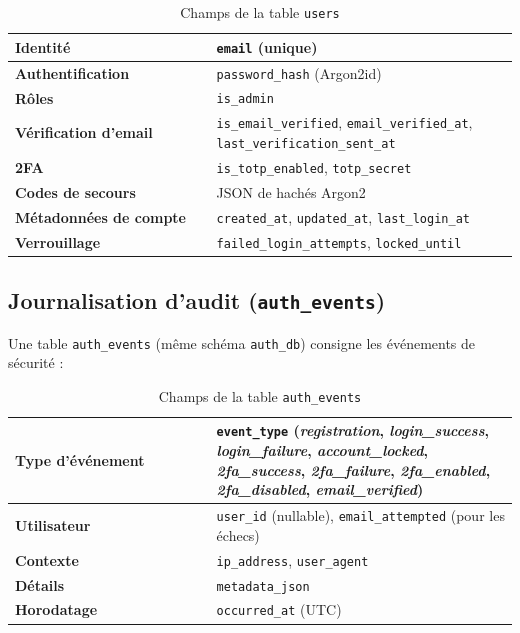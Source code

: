 \begin{table}[H]
\centering
\caption{Champs de la table \texttt{users}}
\label{tab:chap10_users_fields}
\noindent\begin{tabular}{@{}p{0.40\linewidth}p{0.60\linewidth}@{}}
\textbf{Identité} & \texttt{email} (unique) \\
\hline
\textbf{Authentification} & \texttt{password\_hash} (Argon2id) \\
\hline
\textbf{Rôles} & \texttt{is\_admin} \\
\hline
\textbf{Vérification d'email} & \texttt{is\_email\_verified}, \texttt{email\_verified\_at}, \texttt{last\_verification\_sent\_at} \\
\hline
\textbf{2FA} & \texttt{is\_totp\_enabled}, \texttt{totp\_secret} \\
\hline
\textbf{Codes de secours} & JSON de hachés Argon2 \\
\hline
\textbf{Métadonnées de compte} & \texttt{created\_at}, \texttt{updated\_at}, \texttt{last\_login\_at} \\
\hline
\textbf{Verrouillage} & \texttt{failed\_login\_attempts}, \texttt{locked\_until} \\
\end{tabular}
\end{table}


\subsection*{Journalisation d'audit (\texttt{auth\_events})}
\noindent Une table \texttt{auth\_events} (même schéma \texttt{auth\_db}) consigne les événements de sécurité :

\begin{table}[H]
\centering
\caption{Champs de la table \texttt{auth\_events}}
\label{tab:chap10_auth_events_fields}
\noindent\begin{tabular}{@{}p{0.40\linewidth}p{0.60\linewidth}@{}}
\textbf{Type d'événement} & \texttt{event\_type} (\textit{registration}, \textit{login\_success}, \textit{login\_failure}, \textit{account\_locked}, \textit{2fa\_success}, \textit{2fa\_failure}, \textit{2fa\_enabled}, \textit{2fa\_disabled}, \textit{email\_verified}) \\
\hline
\textbf{Utilisateur} & \texttt{user\_id} (nullable), \texttt{email\_attempted} (pour les échecs) \\
\hline
\textbf{Contexte} & \texttt{ip\_address}, \texttt{user\_agent} \\
\hline
\textbf{Détails} & \texttt{metadata\_json} \\
\hline
\textbf{Horodatage} & \texttt{occurred\_at} (UTC) \\
\end{tabular}
\end{table}

